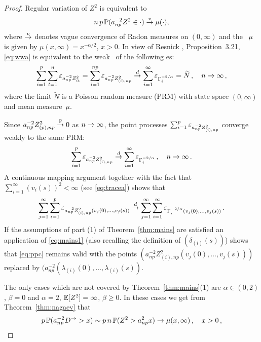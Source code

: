\begin{proof}
Regular variation of $Z^2$ is equivalent to
\begin{equation}\label{eq:wwa}
n\,p\, \P(a_{np}^{-2} Z^2  \in \cdot ) \civ \mu(\cdot),
\end{equation}
where $\civ$ denotes vague convergence of Radon measures on  $(0,\infty)$ and the \ms\ $\mu$ is given by $\mu(x,\infty)=x^{-\alpha/2}$, $x>0$.
In view of Resnick \cite{resnick:1987}, Proposition~3.21, \eqref{eq:wwa} is equivalent
to the weak \con\ of the following \pp es:
\begin{equation*}
\sum_{i=1}^p\sum_{t=1}^n \vep_{a_{np}^{-2} Z_{it}^2}=\sum_{i=1}^{np} \vep_{a_{np}^{-2} Z^2_{(i),np}}\cid
\sum_{i=1}^\infty\vep_{\Gamma_i^{-2/\alpha} }=\widetilde{N}\,,\quad
\nto\,,
\end{equation*}
where the limit $\widetilde{N}$ is a Poisson random measure (PRM) with state space $(0,\infty)$ and
mean measure~$\mu$.
\par
Since $a_{np}^{-2} Z^2_{(p),np}\cip 0$ as $\nto$,
the point processes $\sum_{i=1}^{p} \vep_{a_{np}^{-2} Z^2_{(i),np}}$ converge weakly to the same PRM:
\begin{equation}\label{eq:ppc}
\sum_{i=1}^{p} \vep_{a_{np}^{-2} Z^2_{(i),np}}\cid
\sum_{i=1}^\infty\vep_{\Gamma_i^{-2/\alpha} }\,,\quad
\nto\,.
\end{equation}
A continuous mapping argument together with the fact that $\sum_{i=1}^\infty (v_i(s))^2<\infty$ (see  \eqref{eq:tracea})
shows that
\begin{equation*}
\sum_{j=1}^{ \infty}\sum_{i=1}^p\vep_{a_{np}^{-2} Z^2_{(i),np}(v_j(0),\ldots,v_j(s))}\cid
\sum_{j=1}^{ \infty}\sum_{i=1}^\infty\vep_{\Gamma_i^{-2/\alpha}  (v_j(0),\ldots,v_j(s))}\,.
\end{equation*}
If the assumptions of part (1) of Theorem~\ref{thm:mains} are satisfied
an application of \eqref{eq:mains1} (also recalling the definition of $(\delta_{(i)}(s))$) shows that \eqref{eq:ppc} remains
valid with the points  $(a_{np}^{-2} Z^2_{(i),np}(v_j(0),\ldots,v_j(s)))$ replaced by
$(a_{np}^{-2} (\lambda_{(i)}(0),\ldots,\lambda_{(i)}(s))$.
\par
The only cases which are not covered by Theorem~\ref{thm:mains}(1) are $\alpha\in (0,2)$, $\beta=0$ and $\alpha=2$, $\E[Z^2]=\infty$, $\beta\ge0$.
In these cases we get from Theorem~\ref{thm:nagaev} that
\begin{equation*}
 p \, \P(a_{np}^{-2} D^\rightarrow>x ) \sim p\,n\, \P( Z^2>a_{np}^{2} x )\to \mu(x,\infty)\,,\quad x>0\,,
\end{equation*}

\end{proof}
